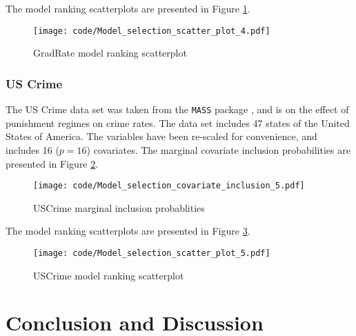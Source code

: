\documentclass{amsart}[12pt]
\begin{document}
The model ranking scatterplots are presented in Figure \ref{fig:GradRate_model_ranking}.

\begin{figure}[p]
	\texttt{[image: code/Model\_selection\_scatter\_plot\_4.pdf]}
	\caption{GradRate model ranking scatterplot}
	\label{fig:GradRate_model_ranking}
\end{figure}

\subsubsection{US Crime}

The US Crime data set was taken from the \texttt{MASS} package \cite{Venables2002}, and is on the effect of
punishment regimes on crime rates. The data set includes 47 states of the United States of America. The
variables have been re-scaled for convenience, and includes 16 ($p=16$) covariates. The marginal covariate
inclusion probabilities are presented in Figure \ref{fig:USCrime_inclusion}.


\begin{figure}[p]
	\texttt{[image: code/Model\_selection\_covariate\_inclusion\_5.pdf]}
	\caption{USCrime marginal inclusion probablities}
	\label{fig:USCrime_inclusion}
\end{figure}

The model ranking scatterplots are presented in Figure \ref{fig:USCrime_model_ranking}.

\begin{figure}[p]
	\texttt{[image: code/Model\_selection\_scatter\_plot\_5.pdf]}
	\caption{USCrime model ranking scatterplot}
	\label{fig:USCrime_model_ranking}
\end{figure}

\section{Conclusion and Discussion}
\label{sec:conclusion}
\end{document}

